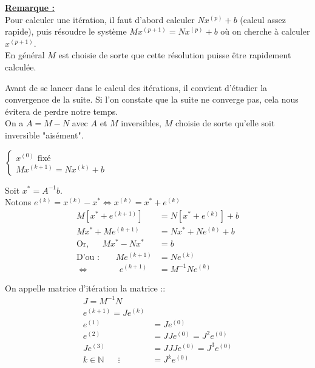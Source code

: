 \noindent \textbf{\underline{Remarque :}}\\
\indent Pour calculer une itération, il faut d'abord calculer $Nx^{(p)} + b$ (calcul assez rapide), puis résoudre le système $Mx^{(p+1)} = Nx^{(p)}+b$ où on cherche à calculer $x^{(p+1)}$.\\
En général $M$ est choisie de sorte que cette résolution puisse être rapidement calculée.

Avant de se lancer dans le calcul des itérations, il convient d'étudier la convergence de la suite. Si l'on constate que la suite ne converge pas, cela nous évitera de perdre notre temps. \\
On a $A = M-N$ avec $A$ et $M$ inversibles, $M$ choisie de sorte qu'elle soit inversible "aisément".

$\begin{cases}
	x^{(0)} \text{ fixé}\\
	Mx^{(k+1)} = Nx^{(k)}+b
\end{cases}$

Soit $x^* = A^{-1}b$. \\
Notons $e^{(k)} = x^{(k)}-x^* \Leftrightarrow x^{(k)} = x^*+e^{(k)}$\\
\begin{align*}
	M\left[x^* + e^{(k+1)}\right] &= N\left[x^* + e^{(k)}\right] + b\\
	Mx^*+Me^{(k+1)} &= Nx^* + Ne^{(k)} + b\\
	\text{Or, } \hspace{15pt} Mx^*-Nx^* &= b\\
	\text{D'ou : } \hspace{19pt} Me^{(k+1)} &= Ne^{(k)}\\
	\Leftrightarrow \hspace{42pt} e^{(k+1)} &= M^{-1}Ne^{(k)} 
\end{align*}



On appelle matrice d'itération la matrice ::
\begin{align*}
J = M^{-1}N\\
e^{(k+1)} = Je^{(k)}\\
e^{(1)} &= Je^{(0)}\\
e^{(2)} &= JJe^{(0)} = J^2e^{(0)}\\
Je^{(3)} &= JJJe^{(0)} = J^3e^{(0)}\\
k \in \mathbb{N} \hspace{20pt} \vdots \hspace{10pt} &= J^ke^{(0)} 
\end{align*}

